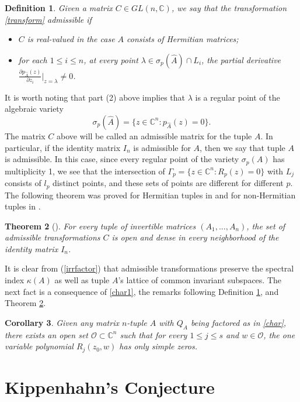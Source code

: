 \documentclass[draft, 12pt, reqno]{amsart}
\newcommand{\C}{{\mathbb C}}
\numberwithin{equation}{section}
\theoremstyle{plain}
\newtheorem{theorem}{Theorem}[section]
\newtheorem{corollary}[theorem]{Corollary}
\newtheorem{definition}[theorem]{Definition}
\begin{document}
\begin{definition}\label{admissible}
Given a matrix $C\in GL(n,\C)$, we say that the transformation \eqref{transform} {\em admissible} if
\begin{itemize}
\item[a)] $C$ is real-valued in the case $A$ consists of Hermitian matrices;
\item[b)] for each $1\leq i\leq n$, at every point $\lambda\in \sigma_p(\widehat{A})\cap L_i$, the partial derivative $\frac{\partial {p}_{\widehat{A}}(z)}{\partial z_i}|_{z=\lambda}\neq 0$.
\end{itemize}	
\end{definition}

\noindent It is worth noting that part (2) above implies that $\lambda$ is a regular point of the algebraic variety \[\sigma_p(\widehat{A})=\{z\in \C^n: p_{\widehat{A}}(z)=0\}.\]
The matrix $C$ above will be called an admissible matrix for the tuple $A$. In particular, if the identity matrix $I_n$ is admissible for $A$, then we say that tuple $A$ is admissible. In this case, since every regular point of the variety $\sigma_p(A)$ has multiplicity 1, we see that the intersection of $\Gamma_p=\big\{z\in \C^n: R_p(z)=0\}$ with $L_j$ consists of $l_p$ distinct points, and these sets of points are different for different $p$. The following theorem was proved for Hermitian tuples in \cite{S1} and for non-Hermitian tuples in \cite{SY}.

\begin{theorem}[\cite{S1, SY}]\label{adm}
For every tuple of invertible matrices $(A_1,...,A_n)$, the set of admissible transformations $C$ is open and dense in every neighborhood of the identity matrix $I_n$.	
\end{theorem}

It is clear from (\ref{irrfactor}) that admissible transformations preserve the spectral index $\kappa(A)$ as well as tuple $A$'s lattice of common invariant subspaces. The next fact is a consequence of \eqref{char1}, the remarks following Definition \ref{admissible}, and Theorem \ref{adm}.
\begin{corollary}\label{admi}
Given any matrix $n$-tuple $A$ with $Q_A$ being factored as in \eqref{char}, there exists an open set $\mathcal{O}\subset \C^n$ such that for every $1\leq j\leq s$ and $w\in \mathcal{O}$, the one variable polynomial $R_j(z_0,w)$ has only simple zeros.
\end{corollary}

\section{Kippenhahn's Conjecture}\label{Kippenhahn}
\end{document}
